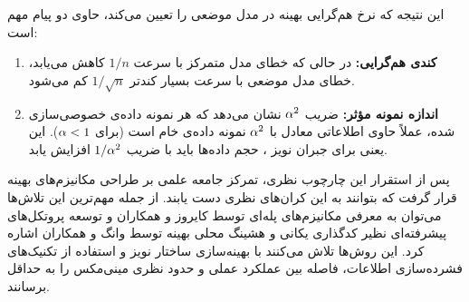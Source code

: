 این نتیجه که نرخ هم‌گرایی بهینه در مدل موضعی را تعیین می‌کند، حاوی دو پیام مهم است:
\begin{enumerate}
    \item \textbf{کندی هم‌گرایی:} در حالی که خطای مدل متمرکز با سرعت $1/n$ کاهش می‌یابد، خطای مدل موضعی با سرعت بسیار کندتر $1/\sqrt{n}$ کم می‌شود.
    \item \textbf{اندازه نمونه مؤثر:} ضریب $\alpha^2$ نشان می‌دهد که هر نمونه داده‌ی خصوصی‌سازی شده، عملاً حاوی اطلاعاتی معادل با $\alpha^2$ نمونه داده‌ی خام است (برای $\alpha < 1$). این یعنی برای جبران نویز \LDP، حجم داده‌ها باید با ضریب $1/\alpha^2$ افزایش یابد.
\end{enumerate}

پس از استقرار این چارچوب نظری، تمرکز جامعه علمی بر طراحی مکانیزم‌های بهینه قرار گرفت که بتوانند به این کران‌های نظری دست یابند.
از جمله مهم‌ترین این تلاش‌ها می‌توان به معرفی مکانیزم‌های پله‌ای توسط کایروز و همکاران \cite{Kairouz2016} و توسعه پروتکل‌های پیشرفته‌ای نظیر کدگذاری یکانی و هشینگ محلی بهینه توسط وانگ و همکاران \cite{Wang2020} اشاره کرد.
این روش‌ها تلاش می‌کنند با بهینه‌سازی ساختار نویز و استفاده از تکنیک‌های فشرده‌سازی اطلاعات، فاصله بین عملکرد عملی و حدود نظری مینی‌مکس را به حداقل برسانند.


